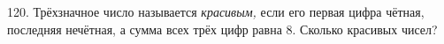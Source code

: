120. Трёхзначное число называется {\it красивым,} если его первая цифра чётная, последняя нечётная, а сумма всех трёх цифр равна 8. Сколько красивых чисел?
\newpage
